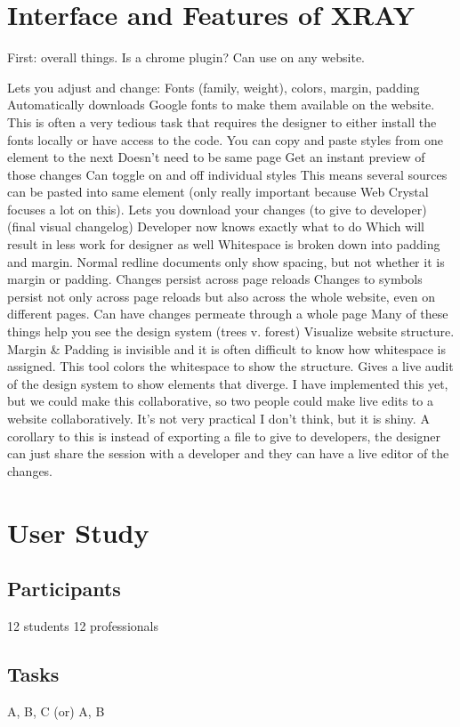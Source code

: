 \documentclass{sigchi}
\begin{document}
\section{Interface and Features of XRAY}
First: overall things. Is a chrome plugin? Can use on any website. 

Lets you adjust and change: 
Fonts (family, weight), colors, margin, padding
Automatically downloads Google fonts to make them available on the website. This is often a very tedious task that requires the designer to either install the fonts locally or have access to the code.
You can copy and paste styles from one element to the next
Doesn’t need to be same page
Get an instant preview of those changes
Can toggle on and off individual styles 
This means several sources can be pasted into same element (only really important because Web Crystal focuses a lot on this).
Lets you download your changes (to give to developer) (final visual changelog)
Developer now knows exactly what to do
Which will result in less work for designer as well
Whitespace is broken down into padding and margin. Normal redline documents only show spacing, but not whether it is margin or padding.
Changes persist across page reloads 
Changes to symbols persist not only across page reloads but also across the whole website, even on different pages. 
Can have changes permeate through a whole page
Many of these things help you see the design system (trees v. forest) 
Visualize website structure. Margin & Padding is invisible and it is often difficult to know how whitespace is assigned. This tool colors the whitespace to show the structure.
Gives a live audit of the design system to show elements that diverge. 
I have implemented this yet, but we could make this collaborative, so two people could make live edits to a website collaboratively. It’s not very practical I don’t think, but it is shiny.
A corollary to this is instead of exporting a file to give to developers, the designer can just share the session with a developer and they can have a live editor of the changes.


\section{User Study}
\subsection{Participants}
12 students
12 professionals

\subsection{Tasks}
A, B, C (or) A, B
\end{document}

